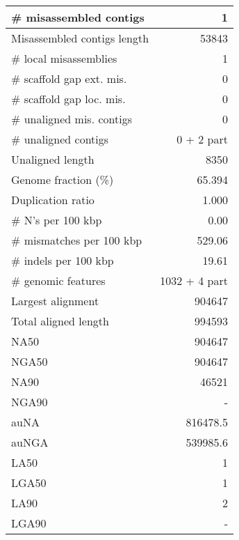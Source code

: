 \documentclass[12pt,a4paper]{article}
\begin{document}
\begin{table}[ht]
\begin{center}
\begin{tabular}{|l*{1}{|r}|}
\# misassembled contigs & 1 \\ \hline
Misassembled contigs length & 53843 \\ \hline
\# local misassemblies & 1 \\ \hline
\# scaffold gap ext. mis. & 0 \\ \hline
\# scaffold gap loc. mis. & 0 \\ \hline
\# unaligned mis. contigs & 0 \\ \hline
\# unaligned contigs & 0 + 2 part \\ \hline
Unaligned length & 8350 \\ \hline
Genome fraction (\%) & 65.394 \\ \hline
Duplication ratio & 1.000 \\ \hline
\# N's per 100 kbp & 0.00 \\ \hline
\# mismatches per 100 kbp & 529.06 \\ \hline
\# indels per 100 kbp & 19.61 \\ \hline
\# genomic features & 1032 + 4 part \\ \hline
Largest alignment & 904647 \\ \hline
Total aligned length & 994593 \\ \hline
NA50 & 904647 \\ \hline
NGA50 & 904647 \\ \hline
NA90 & 46521 \\ \hline
NGA90 & - \\ \hline
auNA & 816478.5 \\ \hline
auNGA & 539985.6 \\ \hline
LA50 & 1 \\ \hline
LGA50 & 1 \\ \hline
LA90 & 2 \\ \hline
LGA90 & - \\ \hline
\end{tabular}
\end{center}
\end{table}
\end{document}
